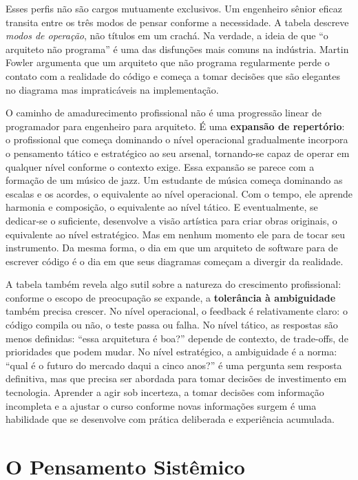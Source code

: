 Esses perfis não são cargos mutuamente exclusivos.
Um engenheiro sênior eficaz transita entre os três modos de pensar
conforme a necessidade. A tabela descreve \emph{modos de operação}, não
títulos em um crachá. Na verdade, a ideia de que ``o arquiteto não
programa'' é uma das disfunções mais comuns na indústria. Martin Fowler
argumenta que um arquiteto que não programa regularmente perde o contato
com a realidade do código e começa a tomar decisões que são elegantes
no diagrama mas impraticáveis na implementação.

O caminho de amadurecimento profissional não é uma progressão linear de
programador para engenheiro para arquiteto. É uma \textbf{expansão de
repertório}: o profissional que começa dominando o nível operacional
gradualmente incorpora o pensamento tático e estratégico ao seu arsenal,
tornando-se capaz de operar em qualquer nível conforme o contexto exige.
Essa expansão se parece com a formação de um músico de jazz. Um estudante
de música começa dominando as escalas e os acordes, o equivalente ao
nível operacional. Com o tempo, ele aprende harmonia e composição, o
equivalente ao nível tático. E eventualmente, se dedicar-se o suficiente,
desenvolve a visão artística para criar obras originais, o equivalente ao
nível estratégico. Mas em nenhum momento ele para de tocar seu
instrumento. Da mesma forma, o dia em que um arquiteto de software para
de escrever código é o dia em que seus diagramas começam a divergir da
realidade.

A tabela também revela algo sutil sobre a natureza do crescimento
profissional: conforme o escopo de preocupação se expande, a
\textbf{tolerância à ambiguidade} também precisa crescer. No nível
operacional, o feedback é relativamente claro: o código compila ou não,
o teste passa ou falha. No nível tático, as respostas são menos
definidas: ``essa arquitetura é boa?'' depende de contexto, de
trade-offs, de prioridades que podem mudar. No nível estratégico, a
ambiguidade é a norma: ``qual é o futuro do mercado daqui a cinco
anos?'' é uma pergunta sem resposta definitiva, mas que precisa ser
abordada para tomar decisões de investimento em tecnologia. Aprender
a agir sob incerteza, a tomar decisões com informação incompleta e a
ajustar o curso conforme novas informações surgem é uma habilidade que
se desenvolve com prática deliberada e experiência acumulada.

\section{O Pensamento Sistêmico}


